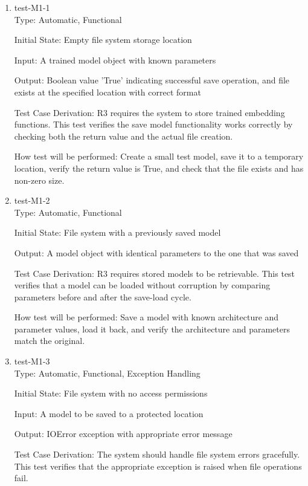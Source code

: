 \documentclass[12pt, titlepage]{article}
\begin{document}
\begin{enumerate}

  \item{test-M1-1\\}
  Type: Automatic, Functional
            
  Initial State: Empty file system storage location
  
  Input: A trained model object with known parameters
            
  Output: Boolean value 'True' indicating successful save operation, and file exists at the specified location with correct format
  
  Test Case Derivation: R3 requires the system to store trained embedding functions. This test verifies the save model functionality works correctly by checking both the return value and the actual file creation.
  
  How test will be performed: Create a small test model, save it to a temporary location, verify the return value is True, and check that the file exists and has non-zero size.
  
  \item{test-M1-2\\}
  Type: Automatic, Functional
            
  Initial State: File system with a previously saved model
            
  Output: A model object with identical parameters to the one that was saved
  
  Test Case Derivation: R3 requires stored models to be retrievable. This test verifies that a model can be loaded without corruption by comparing parameters before and after the save-load cycle.
  
  How test will be performed: Save a model with known architecture and parameter values, load it back, and verify the architecture and parameters match the original.
  
  \item{test-M1-3\\}
  Type: Automatic, Functional, Exception Handling
            
  Initial State: File system with no access permissions
            
  Input: A model to be saved to a protected location
            
  Output: IOError exception with appropriate error message
  
  Test Case Derivation: The system should handle file system errors gracefully. This test verifies that the appropriate exception is raised when file operations fail.
  

\end{enumerate}
\end{document}
